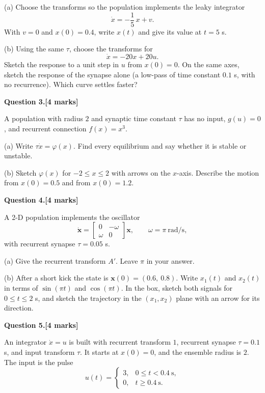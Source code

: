 \documentclass[11pt,letterpaper]{article}
\newcommand{\question}[2]{\par\vspace{10pt}\textbf{Question #1.}\hfill\textbf{[#2 marks]}\par}
\newcommand{\answerbox}[1]{\par\noindent\framebox[\linewidth]{\rule{0pt}{#1}}\par}
\begin{document}
(a) Choose the transforms so the population implements the leaky integrator
\[
\dot x = -\frac{1}{5}\,x + v.
\]
With $v = 0$ and $x(0) = 0.4$, write $x(t)$ and give its value at $t = 5$ s.
\vspace{4.4cm}

(b) Using the same $\tau$, choose the transforms for
\[
\dot x = -20x + 20u.
\]
Sketch the response to a unit step in $u$ from $x(0) = 0$. On the same axes, sketch the response of the synapse alone (a low-pass of time constant $0.1$ s, with no recurrence). Which curve settles faster?
\vspace{5.2cm}

\newpage
\question{3}{4}
A population with radius $2$ and synaptic time constant $\tau$ has no input, $g(u) = 0$, and recurrent connection $f(x) = x^3$.

(a) Write $\tau\dot x = \varphi(x)$. Find every equilibrium and say whether it is stable or unstable.
\vspace{3.6cm}

(b) Sketch $\varphi(x)$ for $-2 \le x \le 2$ with arrows on the $x$-axis. Describe the motion from $x(0) = 0.5$ and from $x(0) = 1.2$.
\answerbox{5.6cm}

\newpage
\question{4}{4}
A 2-D population implements the oscillator
\[
\dot{\mathbf x} = \begin{bmatrix} 0 & -\omega \\ \omega & 0 \end{bmatrix}\mathbf x, \qquad \omega = \pi~\text{rad/s},
\]
with recurrent synapse $\tau = 0.05$ s.

(a) Give the recurrent transform $A'$. Leave $\pi$ in your answer.
\vspace{2.6cm}

(b) After a short kick the state is $\mathbf x(0) = (0.6,\ 0.8)$. Write $x_1(t)$ and $x_2(t)$ in terms of $\sin(\pi t)$ and $\cos(\pi t)$. In the box, sketch both signals for $0 \le t \le 2$ s, and sketch the trajectory in the $(x_1, x_2)$ plane with an arrow for its direction.
\answerbox{5.2cm}

\newpage
\question{5}{4}
An integrator $\dot x = u$ is built with recurrent transform $1$, recurrent synapse $\tau = 0.1$ s, and input transform $\tau$. It starts at $x(0) = 0$, and the ensemble radius is $2$. The input is the pulse
\[
u(t) = \begin{cases} 3, & 0 \le t < 0.4~\text{s},\\ 0, & t \ge 0.4~\text{s}. \end{cases}
\]
\end{document}
